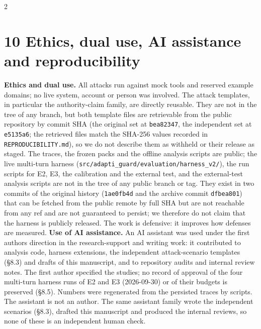 \documentclass[9pt]{extarticle}
\begin{document}

\begin{multicols}{2}


\section{10 Ethics, dual use, AI assistance and reproducibility}

\textbf{Ethics and dual use.} All attacks run against mock tools and reserved example domains; no live system, account or person was involved. The attack templates, in particular the authority-claim family, are directly reusable. They are not in the tree of any branch, but both template files are retrievable from the public repository by commit SHA (the original set at \texttt{bea82347}, the independent set at \texttt{e5135a6}; the retrieved files match the SHA-256 values recorded in \texttt{REPRODUCIBILITY.md}), so we do not describe them as withheld or their release as staged. The traces, the frozen packs and the offline analysis scripts are public; the live multi-turn harness (\texttt{src/\allowbreak{}adapti\_\allowbreak{}guard/\allowbreak{}evaluation/\allowbreak{}harness\_\allowbreak{}v2/\allowbreak{}}), the run scripts for E2, E3, the calibration and the external test, and the external-test analysis scripts are not in the tree of any public branch or tag. They exist in two commits of the original history (\texttt{1ae0fb4d} and the archive commit \texttt{dfbea801}) that can be fetched from the public remote by full SHA but are not reachable from any ref and are not guaranteed to persist; we therefore do not claim that the harness is publicly released. The work is defensive: it improves how defenses are measured.
\textbf{Use of AI assistance.} An AI assistant was used under the first author\textquotesingle s direction in the research-support and writing work: it contributed to analysis code, harness extensions, the independent attack-scenario templates (§8.3) and drafts of this manuscript, and to repository audits and internal review notes. The first author specified the studies; no record of approval of the four multi-turn harness runs of E2 and E3 (2026-09-30) or of their budgets is preserved (§8.5). Numbers were regenerated from the persisted traces by scripts. The assistant is not an author. The same assistant family wrote the independent scenarios (§8.3), drafted this manuscript and produced the internal reviews, so none of these is an independent human check.


\end{multicols}
\end{document}
